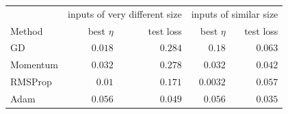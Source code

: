 \begin{tabular}{lrrrr}
\toprule
 & \multicolumn{2}{c}{inputs of very different size} & \multicolumn{2}{c}{inputs of similar size} \\
Method & best $\eta$ & test loss & best $\eta$ & test loss \\
\midrule
GD & $0.018$ & $0.284$ & $0.18$ & $0.063$ \\
Momentum & $0.032$ & $0.278$ & $0.032$ & $0.042$ \\
RMSProp & $0.01$ & $0.171$ & $0.0032$ & $0.057$ \\
Adam & $0.056$ & $0.049$ & $0.056$ & $0.035$ \\
\bottomrule
\end{tabular}
